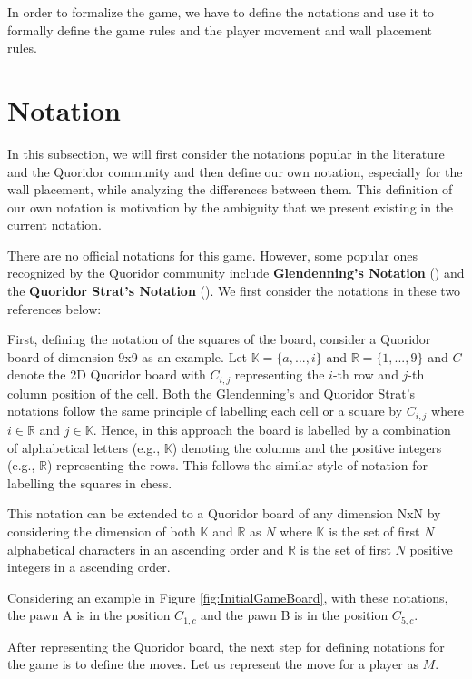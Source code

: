 In order to formalize the game, we have to define the notations and use it to formally define the game rules and the player movement and wall placement rules.

\section{Notation}

In this subsection, we will first consider the notations popular in the literature and the Quoridor community and then define our own notation, especially for the wall placement, while analyzing the differences between them. This definition of our own notation is motivation by the ambiguity that we present existing in the current notation.

There are no official notations for this game. However, some popular ones recognized by the Quoridor community
include \textbf{Glendenning's Notation} (\citep{Glendenning2002MasteringQ}) and the \textbf{Quoridor Strat's Notation}
(\citep{website:COMMUNITY_NOTATION}). We first consider the notations in these two references below:

First, defining the notation of the squares of the board, consider a Quoridor board of dimension 9x9 as an example. Let $\mathbb{K} = \{a, ..., i\}$ and $\mathbb{R} = \{1, ..., 9\}$ and $C$ denote the 2D Quoridor board with $C_{i,j}$ representing the $i$-th row and $j$-th column position of the cell. Both the Glendenning's and Quoridor Strat's notations follow the same principle of labelling each cell or a square by $C_{i,j}$ where $i \in \mathbb{R}$ and $j \in \mathbb{K}$. Hence, in this approach the board is labelled by a combination of alphabetical letters (e.g., $\mathbb{K}$) denoting the columns and the positive integers (e.g., $\mathbb{R}$) representing the rows. This follows the similar style of notation for labelling the squares in chess.

This notation can be extended to a Quoridor board of any dimension NxN by considering the dimension of both $\mathbb{K}$ and $\mathbb{R}$ as $N$ where $\mathbb{K}$ is the set of first $N$ alphabetical characters in an ascending order and $\mathbb{R}$ is the set of first $N$ positive integers in a ascending order.


Considering an example in Figure \ref{fig:InitialGameBoard}, with these notations, the pawn A is in the position $C_{1, c}$ and the pawn B is in the position $C_{5, c}$.

After representing the Quoridor board, the next step for defining notations for the game is to define the moves. Let us represent the move for a player as $M$.

